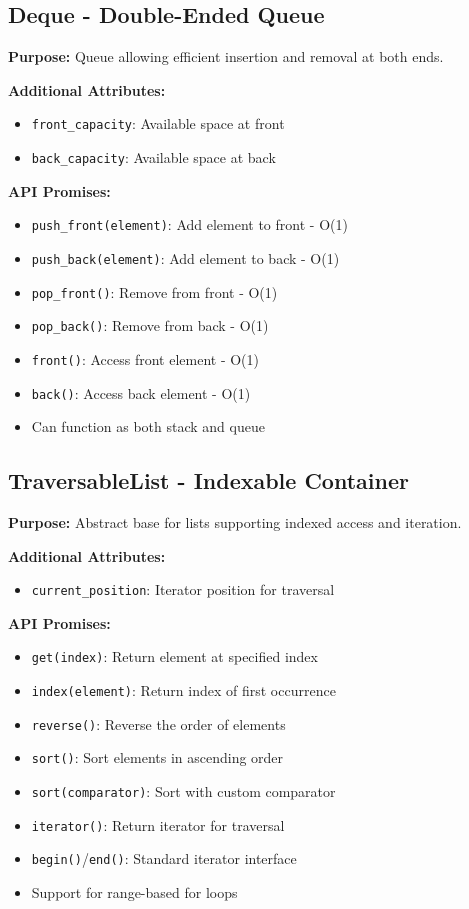 \documentclass[12pt,a4paper]{article}
\begin{document}
\subsection{Deque - Double-Ended Queue}

\textbf{Purpose:} Queue allowing efficient insertion and removal at both ends.

\textbf{Additional Attributes:}
\begin{itemize}
    \item \texttt{front\_capacity}: Available space at front
    \item \texttt{back\_capacity}: Available space at back
\end{itemize}

\textbf{API Promises:}
\begin{itemize}
    \item \texttt{push\_front(element)}: Add element to front - O(1)
    \item \texttt{push\_back(element)}: Add element to back - O(1)
    \item \texttt{pop\_front()}: Remove from front - O(1)
    \item \texttt{pop\_back()}: Remove from back - O(1)
    \item \texttt{front()}: Access front element - O(1)
    \item \texttt{back()}: Access back element - O(1)
    \item Can function as both stack and queue
\end{itemize}

\subsection{TraversableList - Indexable Container}

\textbf{Purpose:} Abstract base for lists supporting indexed access and iteration.

\textbf{Additional Attributes:}
\begin{itemize}
    \item \texttt{current\_position}: Iterator position for traversal
\end{itemize}

\textbf{API Promises:}
\begin{itemize}
    \item \texttt{get(index)}: Return element at specified index
    \item \texttt{index(element)}: Return index of first occurrence
    \item \texttt{reverse()}: Reverse the order of elements
    \item \texttt{sort()}: Sort elements in ascending order
    \item \texttt{sort(comparator)}: Sort with custom comparator
    \item \texttt{iterator()}: Return iterator for traversal
    \item \texttt{begin()}/\texttt{end()}: Standard iterator interface
    \item Support for range-based for loops
\end{itemize}
\end{document}
